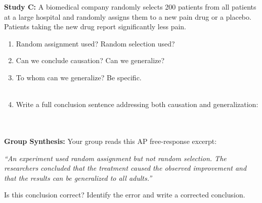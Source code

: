 \documentclass[10pt]{article}
\begin{document}
\vspace{0.1in}

\textbf{Study C:} A biomedical company randomly selects 200 patients from all
patients at a large hospital and randomly assigns them to a new pain drug or a
placebo. Patients taking the new drug report significantly less pain.

\begin{practicebox}
\small
\begin{enumerate}[leftmargin=1.5em, itemsep=7pt]
  \item Random assignment used? \blank{3cm} \quad Random selection used? \blank{3cm}
  \item Can we conclude causation? \blank{3cm} \quad Can we generalize? \blank{3cm}
  \item To whom can we generalize? Be specific.\\
        \writeline\\[1pt]\writeline
  \item Write a full conclusion sentence addressing both causation and generalization:\\
        \writeline\\[1pt]\writeline\\[1pt]\writeline
\end{enumerate}
\end{practicebox}

\vspace{0.12in}

\begin{practicebox}
\small
\textbf{Group Synthesis:} Your group reads this AP free-response excerpt:

\vspace{4pt}
\textit{``An experiment used random assignment but not random selection. The
researchers concluded that the treatment caused the observed improvement and that
the results can be generalized to all adults.''}

\vspace{6pt}
Is this conclusion correct? Identify the error and write a corrected conclusion.\\[6pt]
\writeline\\[1pt]\writeline\\[1pt]\writeline
\end{practicebox}
\end{document}
